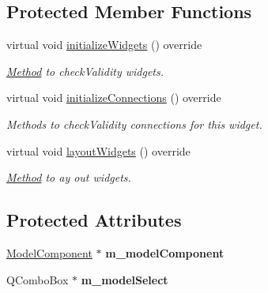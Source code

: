 \subsection*{Protected Member Functions}
\begin{DoxyCompactItemize}
\item 
\mbox{\label{classrev_1_1_view_1_1_model_select_widget_ad744552ca90a82323e0081724fff4397}} 
virtual void \mbox{\hyperlink{classrev_1_1_view_1_1_model_select_widget_ad744552ca90a82323e0081724fff4397}{initialize\+Widgets}} () override
\begin{DoxyCompactList}\small\item\em \mbox{\hyperlink{struct_method}{Method}} to check\+Validity widgets. \end{DoxyCompactList}\item 
\mbox{\label{classrev_1_1_view_1_1_model_select_widget_abb5325dbe6ad59ea0251ac3263ad5a5a}} 
virtual void \mbox{\hyperlink{classrev_1_1_view_1_1_model_select_widget_abb5325dbe6ad59ea0251ac3263ad5a5a}{initialize\+Connections}} () override
\begin{DoxyCompactList}\small\item\em Methods to check\+Validity connections for this widget. \end{DoxyCompactList}\item 
\mbox{\label{classrev_1_1_view_1_1_model_select_widget_ac63d8ea030ac1f450c233a3374cab434}} 
virtual void \mbox{\hyperlink{classrev_1_1_view_1_1_model_select_widget_ac63d8ea030ac1f450c233a3374cab434}{layout\+Widgets}} () override
\begin{DoxyCompactList}\small\item\em \mbox{\hyperlink{struct_method}{Method}} to ay out widgets. \end{DoxyCompactList}\end{DoxyCompactItemize}
\subsection*{Protected Attributes}
\begin{DoxyCompactItemize}
\item 
\mbox{\label{classrev_1_1_view_1_1_model_select_widget_a6262910e237c4eed8670c24b83802426}} 
\mbox{\hyperlink{classrev_1_1_model_component}{Model\+Component}} $\ast$ {\bfseries m\+\_\+model\+Component}
\item 
\mbox{\label{classrev_1_1_view_1_1_model_select_widget_aac7a5b80a4e3ab35f31f26c070f342df}} 
Q\+Combo\+Box $\ast$ {\bfseries m\+\_\+model\+Select}
\end{DoxyCompactItemize}
